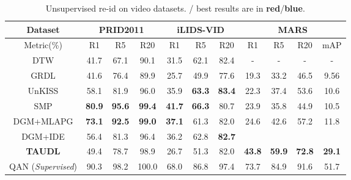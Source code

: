\documentclass[runningheads]{llncs}
\begin{document}
\begin{table}[h]
	\centering
	\setlength{\tabcolsep}{0.07cm}
	\caption{Unsupervised re-id on video datasets.
		/ best results are in \textbf{\color{red}red}/\textbf{\color{blue}blue}.
	}
	\label{tab:vide_SOTA}
	\begin{tabular}
		{c||c|c|c||c|c|c||c|c|c|c}
		\hline
		Dataset		    						
		& \multicolumn{3}{c||}{PRID2011 \cite{hirzer2011person}}      	
		& \multicolumn{3}{c||}{iLIDS-VID \cite{wang2014person}}		
		& \multicolumn{4}{c}{MARS \cite{zheng2016mars}} 										
		\\ \hline\hline
		Metric(\%) 							
		& R1 	& R5 	& R20 				
		& R1 	& R5 	& R20 		 		
		& R1 	& R5	& R20 			& mAP
		\\ \hline \hline
		DTW \cite{ma2017person}            		
		& 41.7   & 67.1   & 90.1		& 31.5   & 62.1   & 82.4	    	 & -      	& - 		& -       	& -
		\\
		GRDL \cite{kodirov2016person}		
		& 41.6	& 76.4	& 89.9				& 25.7	& 49.9	& 77.6				& 19.3			& 33.2			& 46.5			& 9.56			\\
		UnKISS \cite{khan2016unsupervised}	
		& 58.1	& 81.9	& 96.0				
		& 35.9	&\color{blue} \bf 63.3	& \color{red} \bf 83.4				
		& 22.3	& 37.4	& 53.6	& 10.6
		\\ 
		SMP \cite{liu2017stepwise}            		
		& \color{red} \bf 80.9   & \color{red} \bf 95.6   & \color{red} \bf99.4				
		& \color{red} \bf 41.7   & \color{red} \bf 66.3   & 80.7	    	 		
		& 23.9   				  & 35.8				    & 44.9			& 10.5
		\\ 
		DGM+MLAPG \cite{ye2017dynamic}     
		&\color{blue} \bf  73.1   				  
		&\color{blue} \bf  92.5   	
		&\color{blue} \bf  99.0
		&\color{blue} \bf 37.1   & 61.3  	& 82.0
		& 24.6   				  & 42.6		& 57.2			& 11.8 			\\ 
		DGM+IDE \cite{ye2017dynamic}         	
		&56.4   & 81.3  &96.4
		& 36.2   				  & 62.8   			    & \color{blue} \bf82.7
		& \textbf{\color{blue}{36.8}}   & \textbf{\color{blue}{54.0}}   & \textbf{\color{blue}{68.5}}   & \textbf{\color{blue}{21.3}}
		\\ 
		\hline
		\textbf{TAUDL} 
		& 49.4 	& 78.7	& 98.9
		& 26.7   & 51.3	& 82.0 
		& \textbf{\color{red}43.8}	& \textbf{\color{red}59.9}	& \textbf{\color{red}72.8}	& \textbf{\color{red}29.1} 
		\\ \hline
		{QAN \cite{liu2017quality}({\em Supervised})}
		& 90.3	& 98.2   & 100.0		& 68.0	& 86.8 	& 97.4 		& 73.7	& 84.9 	& 91.6 	& 51.7
		\\ \hline
	\end{tabular}
\end{table}
\end{document}
